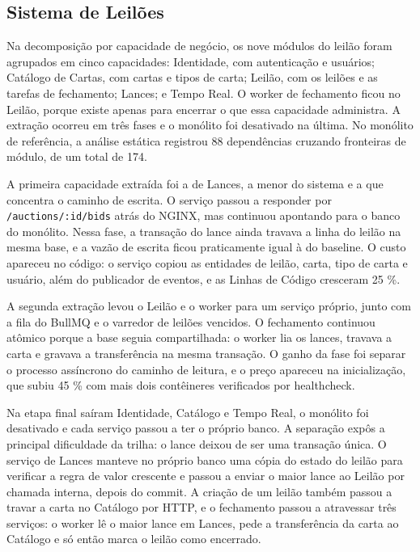 



\subsection*{Sistema de Leilões}

Na decomposição por capacidade de negócio, os nove módulos do leilão foram agrupados em cinco capacidades: Identidade, com autenticação e usuários; Catálogo de Cartas, com cartas e tipos de carta; Leilão, com os leilões e as tarefas de fechamento; Lances; e Tempo Real. O worker de fechamento ficou no Leilão, porque existe apenas para encerrar o que essa capacidade administra. A extração ocorreu em três fases e o monólito foi desativado na última. No monólito de referência, a análise estática registrou 88 dependências cruzando fronteiras de módulo, de um total de 174.

A primeira capacidade extraída foi a de Lances, a menor do sistema e a que concentra o caminho de escrita. O serviço passou a responder por \texttt{/auctions/:id/bids} atrás do NGINX, mas continuou apontando para o banco do monólito. Nessa fase, a transação do lance ainda travava a linha do leilão na mesma base, e a vazão de escrita ficou praticamente igual à do baseline. O custo apareceu no código: o serviço copiou as entidades de leilão, carta, tipo de carta e usuário, além do publicador de eventos, e as Linhas de Código cresceram 25 \%.

A segunda extração levou o Leilão e o worker para um serviço próprio, junto com a fila do BullMQ e o varredor de leilões vencidos. O fechamento continuou atômico porque a base seguia compartilhada: o worker lia os lances, travava a carta e gravava a transferência na mesma transação. O ganho da fase foi separar o processo assíncrono do caminho de leitura, e o preço apareceu na inicialização, que subiu 45 \% com mais dois contêineres verificados por healthcheck.

Na etapa final saíram Identidade, Catálogo e Tempo Real, o monólito foi desativado e cada serviço passou a ter o próprio banco. A separação expôs a principal dificuldade da trilha: o lance deixou de ser uma transação única. O serviço de Lances manteve no próprio banco uma cópia do estado do leilão para verificar a regra de valor crescente e passou a enviar o maior lance ao Leilão por chamada interna, depois do commit. A criação de um leilão também passou a travar a carta no Catálogo por HTTP, e o fechamento passou a atravessar três serviços: o worker lê o maior lance em Lances, pede a transferência da carta ao Catálogo e só então marca o leilão como encerrado.

